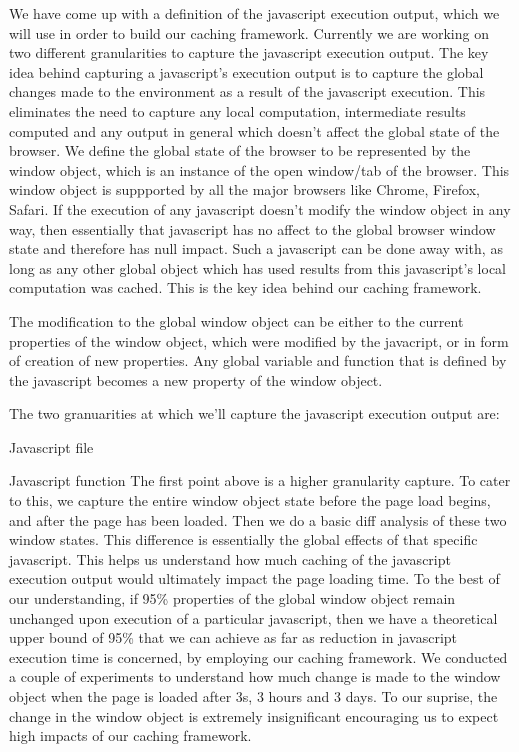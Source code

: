 We have come up with a definition of the javascript execution output, which we will use in order
to build our caching framework. Currently we are working on two different granularities to 
capture the javascript execution output. The key idea behind capturing a javascript's execution output 
is to capture the global changes made to the environment as a result of the javascript execution. 
This eliminates the need to capture any local computation, intermediate results computed and any output
in general which doesn't affect the global state of the browser. 
We define the global state of the browser to be represented by the window object, which is
an instance of the open window/tab of the browser. This window object is suppported by all the 
major browsers like Chrome, Firefox, Safari. 
If the execution of any javascript doesn't modify the window object in any way, then essentially
that javascript has no affect to the global browser window state and therefore has null impact.
Such a javascript can be done away with, as long as any other global object which has used results
from this javascript's local computation was cached. This is the key idea behind our caching framework. 

The modification to the global window object can be either to the current properties of the window
object, which were modified by the javacript, or in form of creation of new properties. Any global variable
and function that is defined by the javascript becomes a new property of the window object.

The two granuarities at which we'll capture the javascript execution output are:
\squishenum
\item Javascript file 
\item Javascript function
\squishenumend
The first point above is a higher granularity capture. To cater to this, we capture the entire window object state
before the page load begins, and after the page has been loaded. Then we do a basic diff analysis of these
two window states. This difference is essentially the global effects of that specific javascript. 
This helps us understand how much caching of the javascript execution output would ultimately impact the 
page loading time. 
To the best of our understanding, if 95\% properties of the global window object remain unchanged upon execution
of a particular javascript, then we have a theoretical upper bound of 95\% that we can achieve as far as reduction in 
javascript execution time is concerned, by employing our caching framework. We conducted a couple of experiments 
to understand how much change is made to the window object when the page is loaded after 3s, 3 hours and 3 days. 
To our suprise, the change in the window object is extremely insignificant encouraging us to expect high impacts
of our caching framework. 

